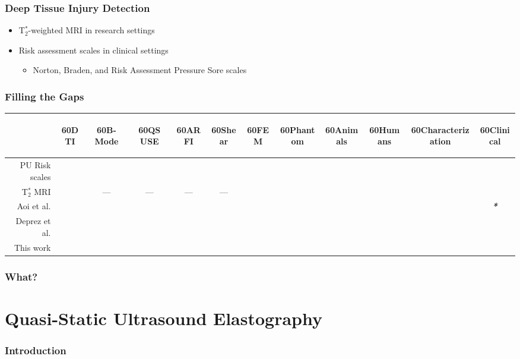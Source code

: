 \documentclass{beamer}
\newcommand{\rotHead}[1]{\begin{rotate}{60}#1\end{rotate}}
\newcommand{\cmark}{\color{KentonBlue}\ding{51}}
\newcommand{\xmark}{\color{KentonRed}\ding{55}}
\begin{document}
		\begin{frame}
			\frametitle{Deep Tissue Injury Detection}
			\begin{itemize}
				\item T$_2^*$-weighted MRI in research settings
				\item Risk assessment scales in clinical settings
				\begin{itemize}
					\item Norton, Braden, and Risk Assessment Pressure Sore scales
				\end{itemize}
			\end{itemize}
		\end{frame}

		\begin{frame}
			\frametitle{Filling the Gaps}
			\begin{center}
				\vspace{1cm}
				\begin{tabular}{r|ccccccccccc}
					& \rotHead{DTI} & \rotHead{B-Mode} & \rotHead{QS USE} & \rotHead{ARFI} & \rotHead{Shear} & \rotHead{FEM} & \rotHead{Phantom} & \rotHead{Animals} & \rotHead{Humans} & \rotHead{Characterization} & \rotHead{Clinical} \\
					\hline
					PU Risk scales & \xmark & \xmark & \xmark & \xmark & \xmark & \xmark & \xmark & \xmark & \cmark & \xmark & \cmark \\
					T$_2^*$ MRI & \cmark & --- & --- & --- & --- & \cmark & \cmark & \cmark& \cmark & \xmark & \xmark \\
					Aoi et al. & \cmark & \cmark & \xmark & \xmark & \xmark & \xmark & \xmark & \xmark & \cmark & \xmark & \emph{\textbf{*}} \\
					Deprez et al. & \cmark & \xmark & \cmark & \xmark & \xmark & \cmark & \cmark & \cmark & \xmark & \xmark & \cmark \\
					This work & \cmark & \xmark & \cmark & \cmark & \cmark & \cmark & \cmark & \xmark & \xmark & \cmark & \cmark \\
				\end{tabular}
			\end{center}
		\end{frame}

		\begin{frame}
			\frametitle{What?}
		\end{frame}

	\section[QS USE]{Quasi-Static Ultrasound Elastography}
		\begin{frame}
			\frametitle{Introduction}
		\end{frame}
\end{document}
